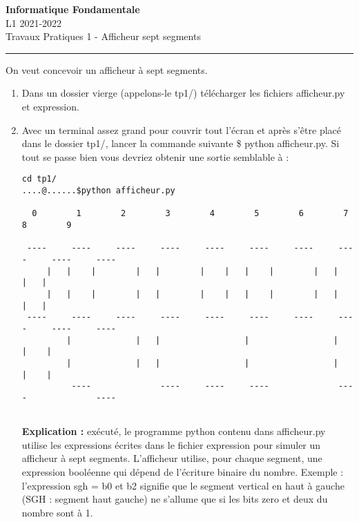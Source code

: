 \documentclass[11pt]{article}
\newcommand{\Mmae}[1]{{\ttfamily #1}}
\begin{document}
\begin{center}
{\LARGE
{\bf Informatique Fondamentale} \\ {\small L1 2021-2022} \\ Travaux Pratiques 1  - Afficheur sept segments}
\end{center}
\noindent\rule{\linewidth}{0.5pt}


On veut concevoir  un afficheur à sept segments.

\begin{enumerate}
   \item Dans un dossier vierge (appelons-le \Mmae{tp1/}) télécharger les fichiers \Mmae{afficheur.py} et \Mmae{expression}.
   \item Avec un terminal assez grand pour couvrir tout l'écran et après s'être placé dans le dossier \Mmae{tp1/},  lancer la commande suivante \Mmae{\$ python afficheur.py}. Si tout se passe bien vous devriez obtenir une sortie semblable à  :
      \begin{verbatim}
cd tp1/
....@......$python afficheur.py
                                                                                    
  0        1        2        3        4        5        6        7        8        9        
                                                                                        
 ----     ----     ----     ----     ----     ----     ----     ----     ----     ----         
     |   |    |        |   |        |    |   |    |        |   |             |   |             
     |   |    |        |   |        |    |   |    |        |   |             |   |             
 ----     ----     ----     ----     ----     ----     ----     ----     ----     ----         
         |             |   |                 |                 |                 |    |        
         |             |   |                 |                 |                 |    |        
          ----              ----     ----     ----              ----              ----         
                                                                     
      \end{verbatim}
      {\bf Explication :} exécuté, le programme python contenu dans  \Mmae{afficheur.py} utilise les expressions écrites dans le fichier \Mmae{expression}
      pour simuler un afficheur à sept segments. 
      L'afficheur utilise, pour chaque segment, une expression booléenne qui dépend de l'écriture binaire du nombre.
      Exemple : l'expression \Mmae{sgh = b0 et b2} signifie que le segment vertical en haut à
      gauche (SGH : segment haut gauche) ne s'allume que si les bits zero et deux du nombre sont à 1. 
      \par


\end{enumerate}
\end{document}
